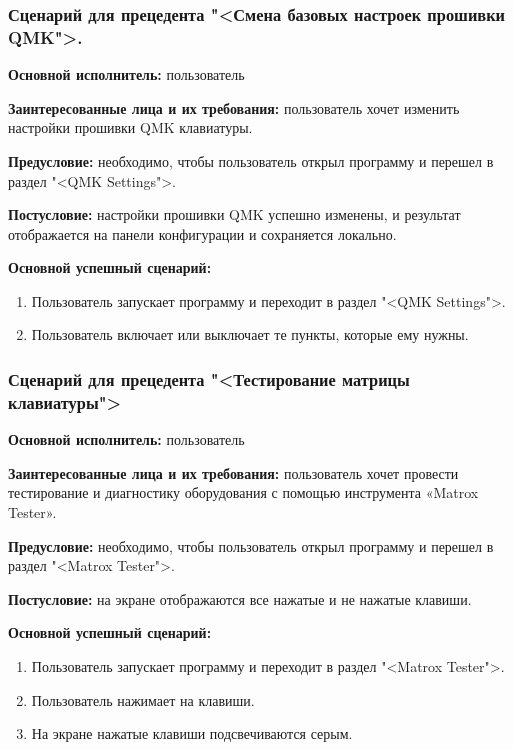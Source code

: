 \subsubsection{Сценарий для прецедента "<Смена базовых настроек прошивки QMK">. }

\textbf{Основной исполнитель:} пользователь

\textbf{Заинтересованные лица и их требования:} пользователь хочет изменить  настройки прошивки QMK клавиатуры.

\textbf{Предусловие:} необходимо, чтобы пользователь открыл программу и перешел в раздел "<QMK Settings">.

\textbf{Постусловие:} настройки прошивки QMK успешно изменены, и результат отображается на панели конфигурации и сохраняется локально.

\textbf{Основной успешный сценарий:}

\begin{enumerate}
\item Пользователь запускает программу и переходит в раздел "<QMK Settings">.
\item Пользователь включает или выключает те пункты, которые ему нужны.
\end{enumerate}

\subsubsection{Сценарий для прецедента "<Тестирование матрицы клавиатуры">}

\textbf{Основной исполнитель:} пользователь

\textbf{Заинтересованные лица и их требования:} пользователь хочет провести тестирование и диагностику оборудования с помощью инструмента «Matrox Tester».

\textbf{Предусловие:} необходимо, чтобы пользователь открыл программу и перешел в раздел "<Matrox Tester">.

\textbf{Постусловие:} на экране отображаются все нажатые и не нажатые клавиши.

\textbf{Основной успешный сценарий:}

\begin{enumerate}
\item Пользователь запускает программу и переходит в раздел "<Matrox Tester">.
\item Пользователь нажимает на клавиши.
\item На экране нажатые клавиши подсвечиваются серым.
\end{enumerate}

